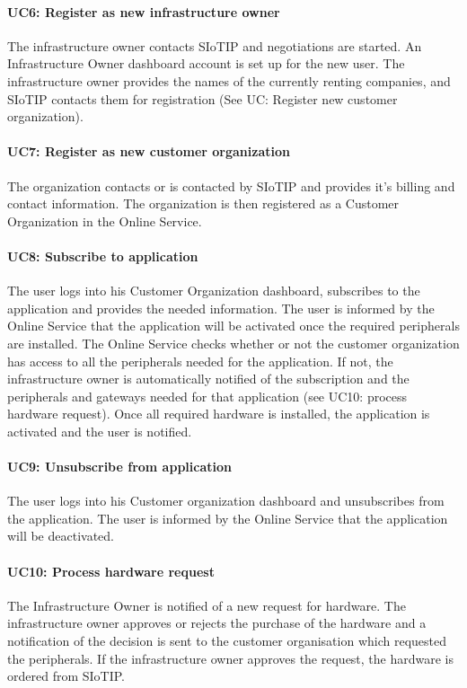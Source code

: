 \documentclass[english]{sareport}
\begin{document}
\paragraph{UC6: Register as new infrastructure owner}
The infrastructure owner contacts SIoTIP and negotiations are started. An Infrastructure Owner dashboard account is set up for the new user. The infrastructure owner provides the names of the currently renting companies, and SIoTIP contacts them for registration (See UC: Register new customer organization).

\paragraph{UC7: Register as new customer organization}
The organization contacts or is contacted by SIoTIP and provides it's billing and contact information. The organization is then registered as a Customer Organization in the Online Service.

\paragraph{UC8: Subscribe to application}
The user logs into his Customer Organization dashboard, subscribes to the application and provides the needed information. The user is informed by the Online Service that the application will be activated once the required peripherals are installed. The Online Service checks whether or not the customer organization has access to all the peripherals needed for the application. If not, the infrastructure owner is automatically notified of the subscription and the peripherals and gateways needed for that application (see UC10: process hardware request). Once all required hardware is installed, the application is activated and the user is notified.

\paragraph{UC9: Unsubscribe from application}
The user logs into his Customer organization dashboard and unsubscribes from the application. The user is informed by the Online Service that the application will be deactivated.

\paragraph{UC10: Process hardware request}
The Infrastructure Owner is notified of a new request for hardware. The infrastructure owner approves or rejects the purchase of the hardware and a notification of the decision is sent to the customer organisation which requested the peripherals. If the infrastructure owner approves the request, the hardware is ordered from SIoTIP.
\end{document}
